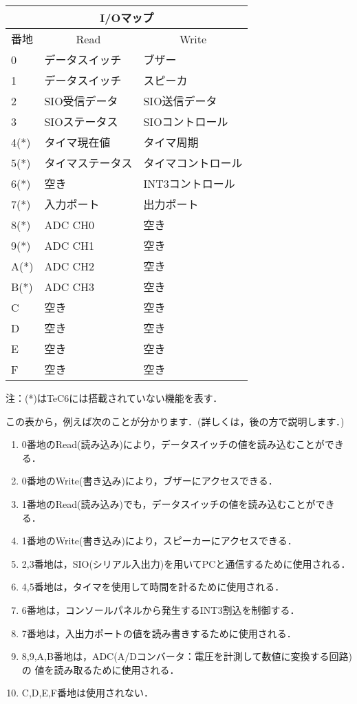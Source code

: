 \begin{center}
{\small
\begin{tabular}{| l | l | l |}
\hline
\multicolumn{3}{|c|}{I/Oマップ} \\
\hline
番地 & \multicolumn{1}{|c|}{Read} & \multicolumn{1}{|c|}{Write} \\
\hline
0    & データスイッチ   & ブザー \\
1    & データスイッチ   & スピーカ \\
2    & SIO受信データ    & SIO送信データ \\
3    & SIOステータス    & SIOコントロール \\
4(*) & タイマ現在値     & タイマ周期 \\
5(*) & タイマステータス & タイマコントロール \\
6(*) & 空き             & INT3コントロール \\
7(*) & 入力ポート       & 出力ポート \\
8(*) & ADC CH0          & 空き \\
9(*) & ADC CH1          & 空き \\
A(*) & ADC CH2          & 空き \\
B(*) & ADC CH3          & 空き \\
C    & 空き             & 空き \\
D    & 空き             & 空き \\
E    & 空き             & 空き \\
F    & 空き             & 空き \\
\hline
\end{tabular}
注：(*)はTeC6には搭載されていない機能を表す．
}
\end{center}

この表から，例えば次のことが分かります．(詳しくは，後の方で説明します．)
\begin{enumerate}
\item 0番地のRead(読み込み)により，データスイッチの値を読み込むことができる．
\item 0番地のWrite(書き込み)により，ブザーにアクセスできる．
\item 1番地のRead(読み込み)でも，データスイッチの値を読み込むことができる．
\item 1番地のWrite(書き込み)により，スピーカーにアクセスできる．
\item 2,3番地は，SIO(シリアル入出力)を用いてPCと通信するために使用される．
\item 4,5番地は，タイマを使用して時間を計るために使用される．
\item 6番地は，コンソールパネルから発生するINT3割込を制御する．
\item 7番地は，入出力ポートの値を読み書きするために使用される．
\item 8,9,A,B番地は，ADC(A/Dコンバータ：電圧を計測して数値に変換する回路)の
値を読み取るために使用される．
\item C,D,E,F番地は使用されない．
\end{enumerate}

